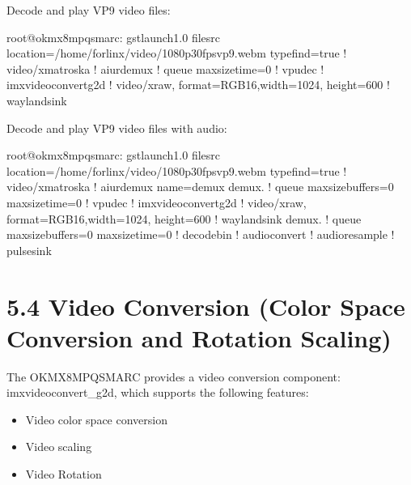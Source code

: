 \documentclass[letterpaper,10pt,openany,english]{sphinxmanual}
\begin{document}
\sphinxAtStartPar
Decode and play VP9 video files:

\begin{sphinxVerbatim}[commandchars=\\\{\}]
root@ok\PYGZhy{}mx8mpq\PYGZhy{}smarc:\PYGZti{}\PYGZsh{} gst\PYGZhy{}launch\PYGZhy{}1.0 filesrc location=/home/forlinx/video/1080p\PYGZus{}30fps\PYGZus{}vp9.webm typefind=true ! video/x\PYGZhy{}matroska ! aiurdemux ! queue max\PYGZhy{}size\PYGZhy{}time=0 ! vpudec ! imxvideoconvert\PYGZus{}g2d ! video/x\PYGZhy{}raw, format=RGB16,width=1024, height=600 ! waylandsink
\end{sphinxVerbatim}

\sphinxAtStartPar
Decode and play VP9 video files with audio:

\begin{sphinxVerbatim}[commandchars=\\\{\}]
root@ok\PYGZhy{}mx8mpq\PYGZhy{}smarc:\PYGZti{}\PYGZsh{} gst\PYGZhy{}launch\PYGZhy{}1.0 filesrc location=/home/forlinx/video/1080p\PYGZus{}30fps\PYGZus{}vp9.webm typefind=true ! video/x\PYGZhy{}matroska ! aiurdemux name=demux demux. ! queue max\PYGZhy{}size\PYGZhy{}buffers=0 max\PYGZhy{}size\PYGZhy{}time=0 ! vpudec ! imxvideoconvert\PYGZus{}g2d ! video/x\PYGZhy{}raw, format=RGB16,width=1024, height=600 ! waylandsink demux. ! queue max\PYGZhy{}size\PYGZhy{}buffers=0 max\PYGZhy{}size\PYGZhy{}time=0 ! decodebin ! audioconvert ! audioresample ! pulsesink
\end{sphinxVerbatim}


\section{5.4 Video Conversion (Color Space Conversion and Rotation Scaling)}
\label{\detokenize{linux-manual:video-conversion-color-space-conversion-and-rotation-scaling}}
\sphinxAtStartPar
The OK\sphinxhyphen{}MX8MPQ\sphinxhyphen{}SMARC provides a video conversion component: imxvideoconvert\_g2d, which supports the following features:
\begin{itemize}
\item {} 
\sphinxAtStartPar
Video color space conversion

\item {} 
\sphinxAtStartPar
Video scaling

\item {} 
\sphinxAtStartPar
Video Rotation

\end{itemize}
\end{document}
